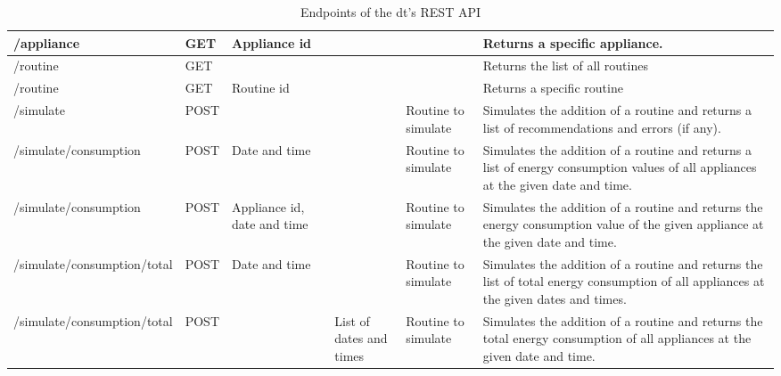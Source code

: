 \begin{table}
{\begin{tabular}{ll>{\raggedright}p{}p{}lp{}}
            /appliance                  & GET    & Appliance id                &                         &                     & Returns a specific appliance.\@                                                                                                        \\ \midrule
            /routine                    & GET    &                             &                         &                     & Returns the list of all routines                                                                                                    \\
            /routine                    & GET    & Routine id                  &                         &                     & Returns a specific routine                                                                                                          \\ \midrule
            /simulate                   & POST   &                             &                         & Routine to simulate & Simulates the addition of a routine and returns a list of recommendations and errors (if any).                                       \\
            /simulate/consumption       & POST   & Date and time               &                         & Routine to simulate & Simulates the addition of a routine and returns a list of energy consumption values of all appliances at the given date and time.    \\
            /simulate/consumption       & POST   & Appliance id, date and time &                         & Routine to simulate & Simulates the addition of a routine and returns the energy consumption value of the given appliance at the given date and time.      \\
            /simulate/consumption/total & POST   & Date and time               &                         & Routine to simulate & Simulates the addition of a routine and returns the list of total energy consumption of all appliances at the given dates and times. \\
            /simulate/consumption/total & POST   &                             & List of dates and times & Routine to simulate & Simulates the addition of a routine and returns the total energy consumption of all appliances at the given date and time.\@           \\ \bottomrule
        \end{tabular}%
    }
    \caption{Endpoints of the \acrshort{dt}'s REST API}%
    \label{tab:rest_api_endpoints}
\end{table}

